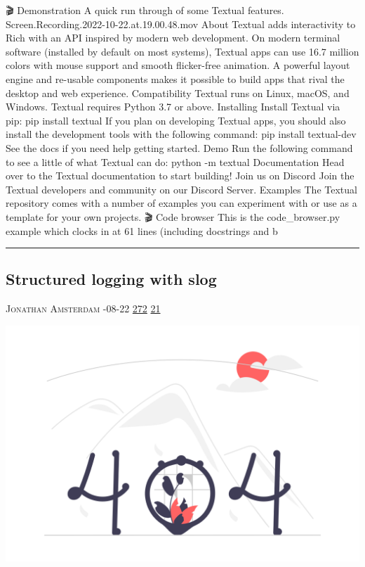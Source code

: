 \documentclass[10pt,a4paper]{article}
\begin{document}
\begin{multicols*}{2}
🎬 Demonstration
A quick run through of some Textual features.
Screen.Recording.2022-10-22.at.19.00.48.mov
About
Textual adds interactivity to Rich with an API inspired by modern web development.
On modern terminal software (installed by default on most systems), Textual apps can use 16.7 million colors with mouse support and smooth flicker-free animation. A powerful layout engine and re-usable components makes it possible to build apps that rival the desktop and web experience.
Compatibility
Textual runs on Linux, macOS, and Windows. Textual requires Python 3.7 or above.
Installing
Install Textual via pip:
pip install textual
If you plan on developing Textual apps, you should also install the development tools with the following command:
pip install textual-dev
See the docs if you need help getting started.
Demo
Run the following command to see a little of what Textual can do:
python -m textual
Documentation
Head over to the Textual documentation to start building!
Join us on Discord
Join the Textual developers and community on our Discord Server.
Examples
The Textual repository comes with a number of examples you can experiment with or use as a template for your own projects.
🎬 Code browser
This is the code\_browser.py example which clocks in at 61 lines (including docstrings and b
\par\noindent\textcolor{red}{\rule{\linewidth}{0.2mm}}
\vfill
\null
\noindent\begin{minipage}{\linewidth}
\subsection{Structured logging with slog}
\textsc{\footnotesize
{\scriptsize\faUser}\space 
Jonathan Amsterdam 
{\scriptsize\faCalendar}-08-22 
{\scriptsize\faThumbsOUp}\space 
\href{http://news.ycombinator.com/item?id=37224651\&utm\_term=comment}{272} 
{\scriptsize\faComments}\space 
\href{http://news.ycombinator.com/item?id=37224651\&utm\_term=comment}{21} 
}
\par\medskip\noindent
\href{https://go.dev/blog/slog?utm\_source=hackernewsletter\&utm\_medium=email\&utm\_term=code}{
    \includegraphics[width=0.99\linewidth]{notfound.png}
}
\end{minipage}

\end{multicols*}
\end{document}
